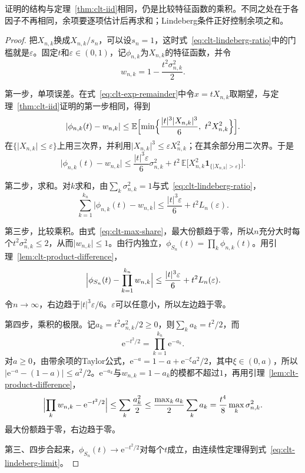 证明的结构与定理~\ref{thm:clt-iid}相同，仍是比较特征函数的乘积。不同之处在于各因子不再相同，余项要逐项估计后再求和；Lindeberg条件正好控制余项之和。

\begin{proof}
把$X_{n,k}$换成$X_{n,k}/s_n$，可以设$s_n=1$，这时式~\eqref{eq:clt-lindeberg-ratio}中的门槛就是$\varepsilon$。固定$t$和$\varepsilon\in(0,1)$，记$\phi_{n,k}$为$X_{n,k}$的特征函数，并令
\[
 w_{n,k}=1-\frac{t^2\sigma_{n,k}^2}{2} .
\]

第一步，单项误差。在式~\eqref{eq:clt-exp-remainder}中令$x=tX_{n,k}$取期望，与定理~\ref{thm:clt-iid}证明的第一步相同，得到
\[
 \lvert\phi_{n,k}(t)-w_{n,k}\rvert\leq\mathbb{E}\Bigl[\min\Bigl\{\frac{\lvert t\rvert^{3}\lvert X_{n,k}\rvert^{3}}{6},\ t^2X_{n,k}^2\Bigr\}\Bigr] .
\]
在$\{\lvert X_{n,k}\rvert\leq\varepsilon\}$上用三次界，并利用$\lvert X_{n,k}\rvert^3\leq\varepsilon X_{n,k}^2$；在其余部分用二次界。于是
\[
 \lvert\phi_{n,k}(t)-w_{n,k}\rvert\leq\frac{\lvert t\rvert^{3}\varepsilon}{6}\sigma_{n,k}^2+t^2\,\mathbb{E}\bigl[X_{n,k}^2\mathbf{1}_{\{\lvert X_{n,k}\rvert>\varepsilon\}}\bigr] .
\]

第二步，求和。对$k$求和，由$\sum_k\sigma_{n,k}^2=1$与式~\eqref{eq:clt-lindeberg-ratio}，
\[
 \sum_{k=1}^{k_n}\lvert\phi_{n,k}(t)-w_{n,k}\rvert\leq\frac{\lvert t\rvert^{3}\varepsilon}{6}+t^2L_n(\varepsilon) .
\]

第三步，比较乘积。由式~\eqref{eq:clt-max-share}，最大份额趋于零，所以$n$充分大时每个$t^2\sigma_{n,k}^2\leq2$，从而$\lvert w_{n,k}\rvert\leq1$。由行内独立，$\phi_{S_n}(t)=\prod_k\phi_{n,k}(t)$。用引理~\ref{lem:clt-product-difference}，
\[
 \Bigl\lvert\phi_{S_n}(t)-\prod_{k=1}^{k_n}w_{n,k}\Bigr\rvert\leq\frac{\lvert t\rvert^{3}\varepsilon}{6}+t^2L_n(\varepsilon) .
\]
令$n\to\infty$，右边趋于$\lvert t\rvert^3\varepsilon/6$。$\varepsilon$可以任意小，所以左边趋于零。

第四步，乘积的极限。记$a_k=t^2\sigma_{n,k}^2/2\geq0$，则$\sum_ka_k=t^2/2$，而
\[
 \mathrm{e}^{-t^2/2}=\prod_{k=1}^{k_n}\mathrm{e}^{-a_k} .
\]
对$a\geq0$，由带余项的Taylor公式，$\mathrm{e}^{-a}=1-a+\mathrm{e}^{-\xi}a^2/2$，其中$\xi\in(0,a)$，所以$\lvert\mathrm{e}^{-a}-(1-a)\rvert\leq a^2/2$。$\mathrm{e}^{-a_k}$与$w_{n,k}=1-a_k$的模都不超过$1$，再用引理~\ref{lem:clt-product-difference}，
\[
 \Bigl\lvert\prod_{k}w_{n,k}-\mathrm{e}^{-t^2/2}\Bigr\rvert\leq\sum_k\frac{a_k^2}{2}\leq\frac{\max_ka_k}{2}\sum_ka_k=\frac{t^4}{8}\max_k\sigma_{n,k}^2 .
\]
最大份额趋于零，右边趋于零。

第三、四步合起来，$\phi_{S_n}(t)\to\mathrm{e}^{-t^2/2}$对每个$t$成立，由连续性定理得到式~\eqref{eq:clt-lindeberg-limit}。
\end{proof}


